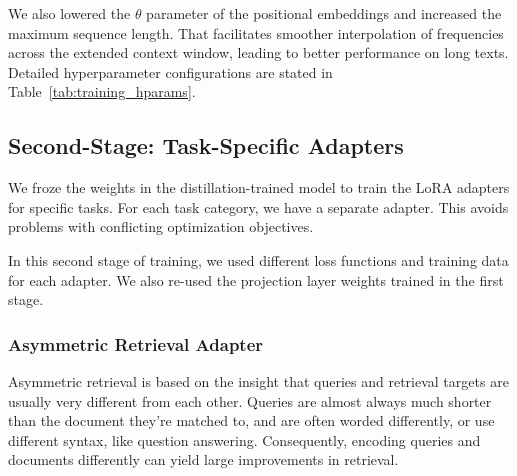 \documentclass[11pt]{article}
\begin{document}
We also lowered the $\theta$ parameter of the positional embeddings and increased the maximum sequence length. That facilitates smoother interpolation of frequencies across the extended context window, leading to better performance on long texts.
Detailed hyperparameter configurations are stated in Table~\ref{tab:training_hparams}.

\subsection{Second-Stage: Task-Specific Adapters}
\label{sec:supervised_fine_tuning}

We froze the weights in the distillation-trained model to train the LoRA adapters for specific tasks.
For each task category, we have a separate adapter.
This avoids problems with conflicting optimization objectives.

In this second stage of training, we used different loss functions and training data for each adapter.
We also re-used the projection layer weights trained in the first stage.



%
\subsubsection{Asymmetric Retrieval Adapter}
\label{sec:retrieval-adapter}

Asymmetric retrieval is based on the insight that queries and retrieval targets are usually very different from each other. Queries are almost always much shorter than the document they’re matched to, and are often worded differently, or use different syntax, like question answering. Consequently, encoding queries and documents differently can yield large improvements in retrieval.
\end{document}
